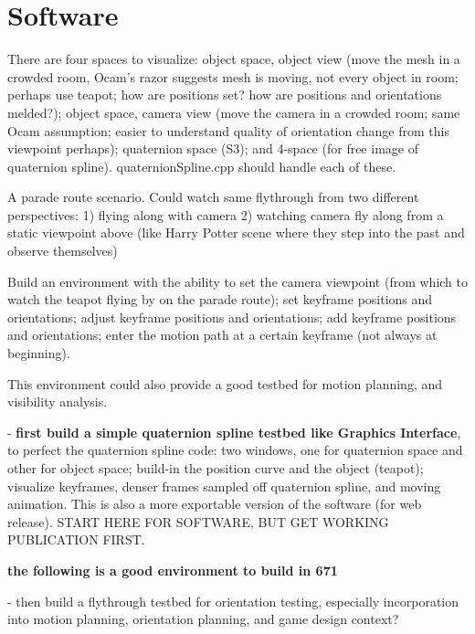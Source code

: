 \documentclass[12pt]{article}
\begin{document}
\section{Software}

There are four spaces to visualize: object space, object view (move the mesh in a crowded
room, Ocam's razor suggests mesh is moving, not every object in room;
perhaps use teapot; how are positions set?  how are positions and orientations melded?);
object space, camera view (move the camera in a crowded room; same Ocam assumption; easier
to understand quality of orientation change from this viewpoint perhaps); 
quaternion space (S3);
and 4-space (for free image of quaternion spline).
quaternionSpline.cpp should handle each of these.

A parade route scenario.
Could watch same flythrough from two different perspectives:
1) flying along with camera
2) watching camera fly along from a static viewpoint above (like Harry Potter scene where
they step into the past and observe themselves)

Build an environment with the ability to set the camera viewpoint (from which to watch
the teapot flying by on the parade route);
set keyframe positions and orientations; adjust keyframe positions and orientations;
add keyframe positions and orientations; enter the motion path at a certain keyframe
(not always at beginning).

This environment could also provide a good testbed for motion planning, and visibility
analysis.

- {\bf first build a simple quaternion spline testbed like Graphics Interface},
  to perfect the quaternion spline code:
  two windows, one for quaternion space and other for object space;
  build-in the position curve and the object (teapot);
  visualize keyframes, denser frames sampled off quaternion spline, and moving animation.
  This is also a more exportable version of the software (for web release).
START HERE FOR SOFTWARE, BUT GET WORKING PUBLICATION FIRST.

{\bf the following is a good environment to build in 671}

- then build a flythrough testbed for orientation testing, especially incorporation
  into motion planning, orientation planning, and game design context?
\end{document}
